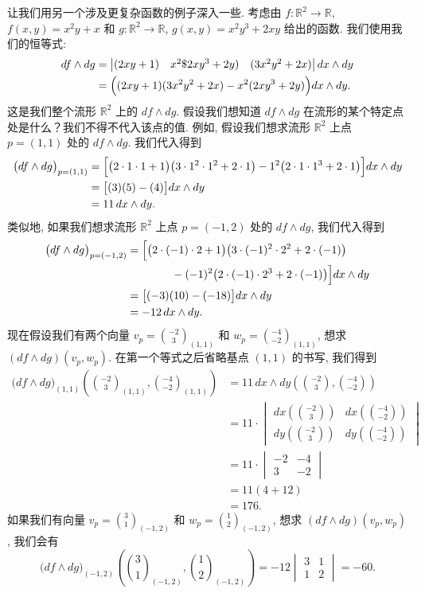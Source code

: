 让我们用另一个涉及更复杂函数的例子深入一些. 考虑由 $f:\mathbb{R}^2\to\mathbb{R}$, $f(x,y)=x^2y+x$ 和 $g:\mathbb{R}^2\to\mathbb{R}$, $g(x,y)=x^2y^3+2xy$ 给出的函数. 我们使用我们的恒等式: 
\[
\begin{aligned}
df\wedge dg&=\begin{vmatrix}(2xy+1)&x^2\$2xy^3+2y)&(3x^2y^2+2x)\end{vmatrix}dx\wedge dy\\
&=\Bigl((2xy+1)(3x^2y^2+2x)-x^2(2xy^3+2y)\Bigr)dx\wedge dy.
\end{aligned}
\]
这是我们整个流形 $\mathbb{R}^2$ 上的 $df\wedge dg$. 假设我们想知道 $df\wedge dg$ 在流形的某个特定点处是什么？我们不得不代入该点的值. 例如, 假设我们想求流形 $\mathbb{R}^2$ 上点 $p=(1,1)$ 处的 $df\wedge dg$. 我们代入得到
\begin{align*}
\bigl(df\wedge dg\bigr)_{p=(1,1)}
&=\Bigl[\bigl(2\cdot 1\cdot 1+1\bigr)\bigl(3\cdot 1^2\cdot 1^2+2\cdot 1\bigr)-1^2\bigl(2\cdot 1\cdot 1^3+2\cdot 1\bigr)\Bigr]dx\wedge dy\\
&=\bigl[(3)(5)-(4)\bigr]dx\wedge dy\\
&=11\,dx\wedge dy.
\end{align*}
类似地, 如果我们想求流形 $\mathbb{R}^2$ 上点 $p=(-1,2)$ 处的 $df\wedge dg$, 我们代入得到
\begin{align*}
\bigl(df\wedge dg\bigr)_{p=(-1,2)}
&=\Bigl[\bigl(2\cdot(-1)\cdot 2+1\bigr)\bigl(3\cdot(-1)^2\cdot 2^2+2\cdot(-1)\bigr)\\
&\qquad\qquad-(-1)^2\bigl(2\cdot(-1)\cdot 2^3+2\cdot(-1)\bigr)\Bigr]dx\wedge dy\\
&=\bigl[(-3)(10)-(-18)\bigr]dx\wedge dy\\
&=-12\,dx\wedge dy.
\end{align*}
现在假设我们有两个向量 $v_p=\binom{-2}{3}_{\!(1,1)}$ 和 $w_p=\binom{-4}{-2}_{\!(1,1)}$, 想求 $(df\wedge dg)(v_p,w_p)$. 在第一个等式之后省略基点 $(1,1)$ 的书写, 我们得到
\begin{align*}
\bigl(df\wedge dg\bigr)_{(1,1)}\left(\binom{-2}{3}_{\!(1,1)},\binom{-4}{-2}_{\!(1,1)}\right)
&=11\,dx\wedge dy\left(\binom{-2}{3},\binom{-4}{-2}\right)\\
&=11\cdot\begin{vmatrix}dx\left(\binom{-2}{3}\right)&dx\left(\binom{-4}{-2}\right)\\[4pt]dy\left(\binom{-2}{3}\right)&dy\left(\binom{-4}{-2}\right)\end{vmatrix}\\
&=11\cdot\begin{vmatrix}-2&-4\\3&-2\end{vmatrix}\\
&=11(4+12)\\
&=176.
\end{align*}
如果我们有向量 $v_p=\binom{3}{1}_{\!(-1,2)}$ 和 $w_p=\binom{1}{2}_{\!(-1,2)}$, 想求 $(df\wedge dg)(v_p,w_p)$, 我们会有
\[
\bigl(df\wedge dg\bigr)_{(-1,2)}\left(\binom{3}{1}_{\!(-1,2)},\binom{1}{2}_{\!(-1,2)}\right)
=-12\begin{vmatrix}3&1\\1&2\end{vmatrix}=-60.
\]

